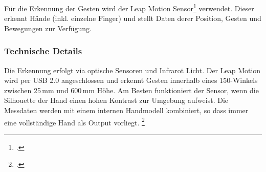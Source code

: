 Für die Erkennung der Gesten wird der Leap Motion Sensor\footcite{Leap_Motion_Motion_Controller_2015-03-27} verwendet.
Dieser erkennt Hände (inkl. einzelne Finger) und stellt Daten derer Position, Gesten und Bewegungen zur Verfügung.

\subsubsection{Technische Details}
Die Erkennung erfolgt via optische Sensoren und Infrarot Licht.
Der Leap Motion wird per USB 2.0 angeschlossen und erkennt Gesten innerhalb eines 150\textdegree-Winkels zwischen 25\,mm und 600\,mm Höhe.
Am Besten funktioniert der Sensor, wenn die Silhouette der Hand einen hohen Kontrast zur Umgebung aufweist.
Die Messdaten werden mit einem internen Handmodell kombiniert, so dass immer eine vollständige Hand als Output vorliegt.
\footcite{API_Overview__Leap_Motion_v2.2_documentation_2015-03-27}


